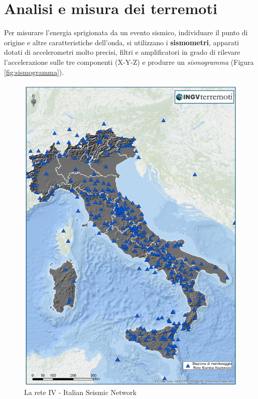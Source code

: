 \documentclass[a4paper,10pt]{memoir}
\begin{document}
\section{Analisi e misura dei terremoti}

Per misurare l'energia sprigionata da un evento sismico, individuare il punto di origine e altre caratteristiche dell'onda, si utilizzano i \textbf{sismometri}, apparati dotati di accelerometri molto precisi, filtri e amplificatori in grado di rilevare l'accelerazione sulle tre componenti (X-Y-Z) e produrre un \textit{sismogramma} (Figura \ref{fig:sismogramma}).

\begin{figure}[p]
\caption{La rete IV - Italian Seismic Network}
\label{fig:retesensori}
\centering
\includegraphics[width=\textwidth]{introduzione/rete_ingv}
\end{figure}
\end{document}
